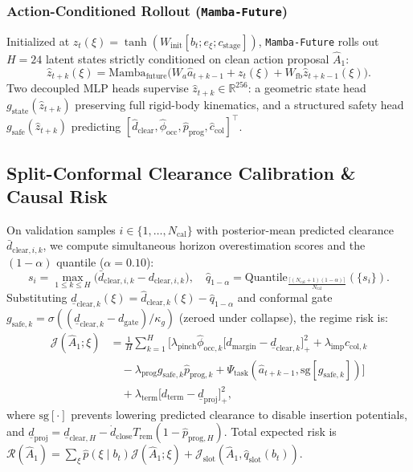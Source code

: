 \documentclass[letterpaper, 10pt, conference]{ieeeconf}
\begin{document}
\subsubsection{Action-Conditioned Rollout (\texttt{Mamba-Future})}
Initialized at $z_t(\xi) = \tanh(W_{\text{init}}[b_t; e_\xi; c_{\text{stage}}])$, \texttt{Mamba-Future} rolls out $H=24$ latent states strictly conditioned on clean action proposal $\hat{A}_1$:
\begin{equation}
    \hat{z}_{t+k}(\xi) = \text{Mamba}_{\text{future}}\!\big(W_a \hat{a}_{t+k-1} + z_t(\xi) + W_{\text{fb}} \hat{z}_{t+k-1}(\xi)\big).
\end{equation}
Two decoupled MLP heads supervise $\hat{z}_{t+k} \in \mathbb{R}^{256}$: a geometric state head $g_{\text{state}}(\hat{z}_{t+k})$ preserving full rigid-body kinematics, and a structured safety head $g_{\text{safe}}(\hat{z}_{t+k})$ predicting $[\hat{d}_{\text{clear}}, \hat{\phi}_{\text{occ}}, \hat{p}_{\text{prog}}, \hat{c}_{\text{col}}]^\top$.

\subsection{Split-Conformal Clearance Calibration \& Causal Risk}
On validation samples $i \in \{1, \dots, N_{\text{cal}}\}$ with posterior-mean predicted clearance $\bar{d}_{\text{clear},i,k}$, we compute simultaneous horizon overestimation scores and the $(1-\alpha)$ quantile ($\alpha=0.10$):
\begin{equation}
    s_i = \max_{1 \le k \le H} \big(\bar{d}_{\text{clear},i,k} - d_{\text{clear},i,k}\big), \quad \hat{q}_{1-\alpha} = \text{Quantile}_{\frac{\lceil(N_{\text{cal}}+1)(1-\alpha)\rceil}{N_{\text{cal}}}}(\{s_i\}).
\end{equation}
Substituting $\underline{d}_{\text{clear},k}(\xi) = \hat{d}_{\text{clear},k}(\xi) - \hat{q}_{1-\alpha}$ and conformal gate $g_{\text{safe},k} = \sigma((\underline{d}_{\text{clear},k} - d_{\text{gate}})/\kappa_g)$ (zeroed under collapse), the regime risk is:
\begin{align}
    \mathcal{J}(\hat{A}_1; \xi) &= \frac{1}{H}\sum_{k=1}^H \Big[\lambda_{\text{pinch}}\hat{\phi}_{\text{occ},k}\big[d_{\text{margin}} - \underline{d}_{\text{clear},k}\big]_+^2 + \lambda_{\text{imp}}\hat{c}_{\text{col},k} \nonumber \\
    &\quad - \lambda_{\text{prog}} g_{\text{safe},k}\hat{p}_{\text{prog},k} + \Psi_{\text{task}}(\hat{a}_{t+k-1}, \text{sg}[g_{\text{safe},k}])\Big] \nonumber \\
    &\quad + \lambda_{\text{term}}\big[d_{\text{term}} - \underline{d}_{\text{proj}}\big]_+^2,
\end{align}
where $\text{sg}[\cdot]$ prevents lowering predicted clearance to disable insertion potentials, and $\underline{d}_{\text{proj}} = \underline{d}_{\text{clear},H} - \dot{d}_{\text{close}} T_{\text{rem}}(1 - \hat{p}_{\text{prog},H})$. Total expected risk is $\mathcal{R}(\hat{A}_1) = \sum_\xi \hat{p}(\xi \mid b_t)\mathcal{J}(\hat{A}_1;\xi) + \mathcal{J}_{\text{slot}}(\hat{A}_1, \hat{q}_{\text{slot}}(b_t))$.
\end{document}

